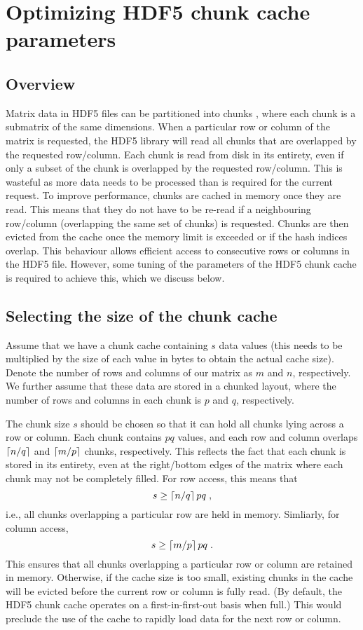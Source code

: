 \documentclass{article}
\begin{document}
\section{Optimizing HDF5 chunk cache parameters}
\label{sec:layoutoptim}

\subsection{Overview}
Matrix data in HDF5 files can be partitioned into chunks \cite{hdf5chunk}, where each chunk is a submatrix of the same dimensions.
When a particular row or column of the matrix is requested, the HDF5 library will read all chunks that are overlapped by the requested row/column.
Each chunk is read from disk in its entirety, even if only a subset of the chunk is overlapped by the requested row/column.
This is wasteful as more data needs to be processed than is required for the current request.
To improve performance, chunks are cached in memory once they are read.
This means that they do not have to be re-read if a neighbouring row/column (overlapping the same set of chunks) is requested.
Chunks are then evicted from the cache once the memory limit is exceeded or if the hash indices overlap.
This behaviour allows efficient access to consecutive rows or columns in the HDF5 file.
However, some tuning of the parameters of the HDF5 chunk cache is required to achieve this, which we discuss below.

\subsection{Selecting the size of the chunk cache}
Assume that we have a chunk cache containing $s$ data values (this needs to be multiplied by the size of each value in bytes to obtain the actual cache size).
Denote the number of rows and columns of our matrix as $m$ and $n$, respectively. 
We further assume that these data are stored in a chunked layout, where the number of rows and columns in each chunk is $p$ and $q$, respectively.

The chunk size $s$ should be chosen so that it can hold all chunks lying across a row or column.
Each chunk contains $pq$ values, and each row and column overlaps $\left \lceil n/q \right \rceil$ and $\left \lceil m/p \right \rceil$ chunks, respectively.
This reflects the fact that each chunk is stored in its entirety, even at the right/bottom edges of the matrix where each chunk may not be completely filled.
For row access, this means that 
\begin{equation}
s \ge \left \lceil n/q \right \rceil pq \;, 
\end{equation}
i.e., all chunks overlapping a particular row are held in memory. Simliarly, for column access, 
\begin{equation}
s \ge \left \lceil m/p \right \rceil pq \;.
\end{equation}
This ensures that all chunks overlapping a particular row or column are retained in memory.
Otherwise, if the cache size is too small, existing chunks in the cache will be evicted before the current row or column is fully read.
(By default, the HDF5 chunk cache operates on a first-in-first-out basis when full.)
This would preclude the use of the cache to rapidly load data for the next row or column.
\end{document}
